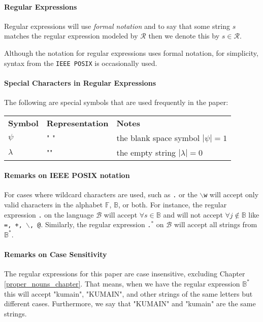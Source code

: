 \paragraph{Regular Expressions}
Regular expressions will use \emph{formal notation} and to say that some string \(s\) matches the regular expression modeled by \(\mathcal{R}\) then we denote this by \(s \in \mathcal{R}\).

Although the notation for regular expressions uses formal notation, for simplicity, syntax from the \texttt{IEEE POSIX} is occasionally used.

\paragraph{Special Characters in Regular Expressions} The following are special symbols that are used frequently in the paper:

\begin{center}
\begin{tabular}{l l l}
        \textbf{Symbol} & \textbf{Representation} & \textbf{Notes}                    \\
        $\psi$          & " "                     & the blank space symbol $|\psi|=1$ \\
        $\lambda$       & ""                      & the empty string $|\lambda| = 0$
    \end{tabular}
\end{center}

\paragraph{Remarks on IEEE POSIX notation} For cases where wildcard characters are used, such as \texttt{.} or the $\backslash$\texttt{w} will accept only valid characters in the alphabet $\mathbb{F}$, $\mathbb{B}$, or both. For instance, the regular expression \texttt{.} on the language $\mathcal{B}$ will accept $\forall s\in \mathbb{B}$ and will not accept $\forall j\notin \mathbb{B}$ like \texttt{=, +, $\backslash$, @}. Similarly, the regular expression \texttt{.$^*$} on $\mathcal{B}$ will accept all strings from $\mathbb{B}^*$.

\paragraph{Remarks on Case Sensitivity} The regular expressions for this paper are case insensitive, excluding Chapter \ref{proper_nouns_chapter}. That means, when we have the regular expression $\mathbb{B}^*$ this will accept "kumain", "KUMAIN", and other strings of the same letters but different cases. Furthermore, we say that "KUMAIN" and "kumain" are the same strings.

